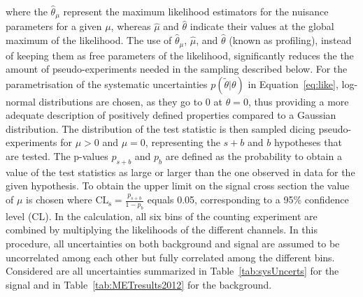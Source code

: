 where the $\hat{\theta}_\mu$ represent the maximum likelihood estimators for the nuisance parameters for a given $\mu$, whereas $\hat{\mu}$ and $\hat{\theta}$ indicate their values at the global maximum of the likelihood. The use of $\hat{\theta}_\mu$, $\hat{\mu}$, and $\hat{\theta}$ (known as profiling), instead of keeping them as free parameters of the likelihood, significantly reduces the the amount of pseudo-experiments needed in the sampling described below. For the parametrisation of the systematic uncertainties $p\left(\tilde{\theta}|\theta\right)$ in Equation~\ref{eq:like}, log-normal distributions are chosen, as they go to 0 at $\theta = 0$, thus providing a more adequate description of positively defined properties compared to a Gaussian distribution. The distribution of the test statistic is then sampled dicing pseudo-experiments for $\mu > 0$ and $\mu = 0$, representing the $s+b$ and $b$ hypotheses that are tested. The p-values $p_{s+b}$ and $p_{b}$ are defined as the probability to obtain a value of the test statistics as large or larger than the one observed in data for the given hypothesis. To obtain the upper limit on the signal cross section the value of $\mu$ is chosen where $\mathrm{CL}_{\mathrm{s}} = \frac{p_{s+b}}{1-p_b}$ equals 0.05, corresponding to a 95\% confidence level (CL). In the calculation, all six bins of the counting experiment are combined by multiplying the likelihoods of the different channels. In this procedure, all uncertainties on both background and signal are assumed to be uncorrelated among each other but fully correlated among the different bins. Considered are all uncertainties summarized in Table~\ref{tab:sysUncerts} for the signal and in Table~\ref{tab:METresults2012} for the background.

